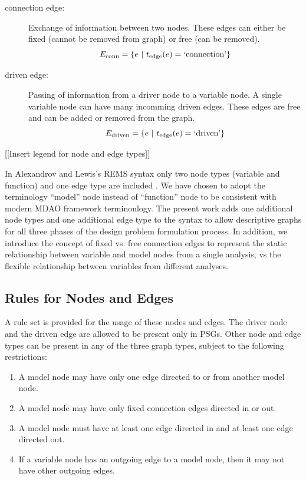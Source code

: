   \begin{description}
  \item[connection edge:] Exchange of information between two nodes. These edges 
  can either be fixed (cannot be removed from graph) or free (can be removed). 
    \begin{equation} 
      E_{\textrm{conn}} = \{e \ | \  t_{\textrm{edge}}(e) = \textrm{`connection'}\}
    \end{equation}
  \item [driven edge:] Passing of information from a driver node to a 
    variable node. A single variable node can have many incomming driven edges. These edges are 
    free and can be added or removed from the graph.
     \begin{equation} 
       E_{\textrm{driven}} = \{e \ | \  t_{\textrm{edge}}(e) = \textrm{`driven'}\}
     \end{equation} 
  \end{description}

  [[Insert legend for node and edge types]]

  In Alexandrov and Lewis's REMS syntax only two node types (variable and function) 
  and one edge type are included \cite{alexandrov2004}. We have chosen to adopt 
  the terminology ``model'' node instead of ``function'' node to be consistent 
  with modern MDAO framework terminonlogy. The present work adds one additional 
  node types and one additional edge type to the syntax to allow descriptive
  graphs for all three phases of the design problem formulation process. In addition, we introduce the 
  concept of fixed vs. free connection edges to represent the
  static relationship between variable and model nodes from a single analysis, 
  vs the flexible relationship between variables from different analyses. 

\subsection{Rules for Nodes and Edges}
  \label{ss:rules}
  A rule set is provided for the usage of these nodes and edges.
  The driver node and the driven edge are allowed to be present only in PSGs.
  Other node and edge types can be present in any of the three graph types, 
  subject to the following restrictions: 
  \begin{enumerate}
  \item A model node may have only one edge directed to or from another model node.
  \item A model node may have only fixed connection edges directed in or out.
  \item A model node must have at least one edge directed in and at least one edge 
    directed out.
  \item If a variable node has an outgoing edge to a model node, then it may not have other outgoing edges.
  \end{enumerate}

